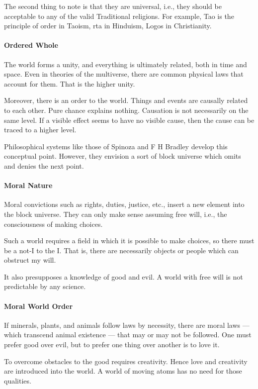 The second thing to note is that they are universal, i.e., they should be acceptable to any of the valid Traditional religions. For example, Tao is the principle of order in Taoism, rta in Hinduism, Logos in Christianity.

\paragraph{Ordered Whole}
The world forms a unity, and everything is ultimately related, both in time and space. Even in theories of the multiverse, there are common physical laws that account for them. That is the higher unity.

Moreover, there is an order to the world. Things and events are causally related to each other. Pure chance explains nothing. Causation is not necessarily on the same level. If a visible effect seems to have no visible cause, then the cause can be traced to a higher level.

Philosophical systems like those of Spinoza and F H Bradley develop this conceptual point. However, they envision a sort of block universe which omits and denies the next point.

\paragraph{Moral Nature}
Moral convictions such as rights, duties, justice, etc., insert a new element into the block universe. They can only make sense assuming free will, i.e., the consciousness of making choices.

Such a world requires a field in which it is possible to make choices, so there must be a not-I to the I. That is, there are necessarily objects or people which can obstruct my will.

It also presupposes a knowledge of good and evil. A world with free will is not predictable by any science.

\paragraph{Moral World Order}
If minerals, plants, and animals follow laws by necessity, there are moral laws — which transcend animal existence — that may or may not be followed. One must prefer good over evil, but to prefer one thing over another is to love it.

To overcome obstacles to the good requires creativity. Hence love and creativity are introduced into the world. A world of moving atoms has no need for those qualities.

